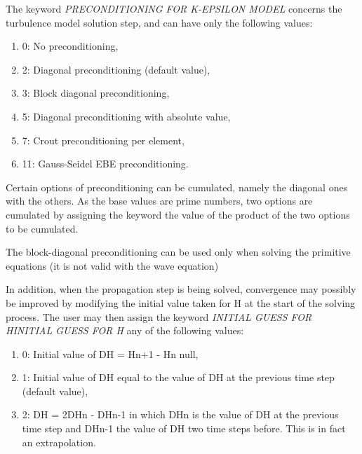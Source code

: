  The keyword \textit{PRECONDITIONING FOR K-EPSILON MODEL} concerns the turbulence model solution step, and can have only the following values:

\begin{enumerate}
\item [\nonumber] 0: No preconditioning,

\item [\nonumber] 2: Diagonal preconditioning (default value),

\item[\nonumber]  3: Block diagonal preconditioning,

\item [\nonumber] 5: Diagonal preconditioning with absolute value,

\item [\nonumber] 7: Crout preconditioning per element,

\item[\nonumber]  11: Gauss-Seidel EBE preconditioning.
\end{enumerate}

 Certain options of preconditioning can be cumulated, namely the diagonal ones with the others. As the base values are prime numbers, two options are cumulated by assigning the keyword the value of the product of the two options to be cumulated.

 The block-diagonal preconditioning can be used only when solving the primitive equations (it is not valid with the wave equation)

 In addition, when the propagation step is being solved, convergence may possibly be improved by modifying the initial value taken for H at the start of the solving process. The user may then assign the keyword \textit{INITIAL GUESS FOR HINITIAL GUESS FOR H} any of the following values:

\begin{enumerate}
\item [\nonumber] 0: Initial value of DH = Hn+1 - Hn  null,

\item [\nonumber] 1: Initial value of DH equal to the value of DH at the previous time step (default value),

\item [\nonumber]  2: DH = 2DHn - DHn-1 in which DHn is the value of DH at the previous time step and DHn-1 the value of DH two time steps before. This is in fact an extrapolation.
\end{enumerate}

